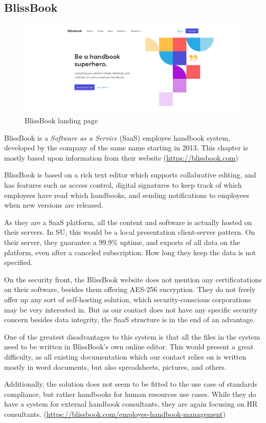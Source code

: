 \subsection{BlissBook}
\begin{figure}[h]
	\includegraphics[width=1\textwidth]{billeder/BlissBooks.png}
	\caption{BlissBook landing page}
\end{figure}
BlissBook is a \textit{Software as a Service} (SaaS) employee handbook system, developed by the company of the same name starting in 2013. %
This chapter is mostly based upon information from their website (\url{https://blissbook.com})


BlissBook is based on a rich text editor which supports collabrative editing, and has features such as access control, digital signatures to keep track of which employees have read which handbooks, and sending notifications to employees when new versions are released.

As they are a SaaS platform, all the content and software is actually hosted on their servers. In SU, this would be a local presentation client-server pattern.
On their server, they guarantee a 99.9\% uptime, and exports of all data on the platform, even after a canceled subscription. How long they keep the data is not specified.

On the security front, the BlissBook website does not mention any certificatations on their software, besides them offering AES-256 encryption. %
They do not freely offer up any sort of self-hosting solution, which security-conscious corporations may be very interested in. But as our contact does not have any specific security concern besides data integrity, the SaaS structure is in the end of an advantage.

One of the greatest disadvantages to this system is that all the files in the system need to be written in BlissBook's own online editor. This would present a great difficulty, as all existing documentation which our contact relies on is written mostly in word documents, but also spreadsheets, pictures, and others.

Additionally, the solution does not seem to be fitted to the use case of standards compliance, but rather handbooks for human resources use cases. While they do have a system for external handbook consultants, they are again focusing on HR consultants. (\url{https://blissbook.com/employee-handbook-management})
